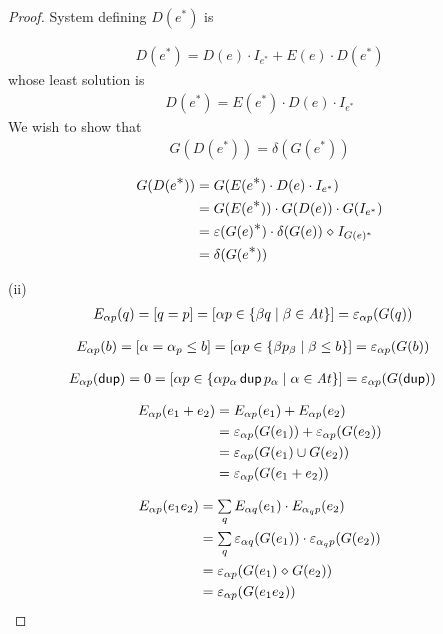 \documentclass{article}
\newcommand\At{\ensuremath{\mathit{At}}}
\renewcommand\smash{\mathrel{\diamond}}
\newcommand\ssum{\mathop{\textstyle\sum}}
\newcommand\pdup{\mathop{\mathsf{dup}}}
\newcommand\bval[1]{[#1]}
\renewcommand\star{^{\textstyle *}}
\begin{document}
\begin{proof}
System defining $D(e\star)$ is

\begin{align*}
D(e\star) = D(e)\cdot I_{e^*} + E(e)\cdot D(e\star)
\end{align*}
whose least solution is 
\begin{align*}
D(e\star) = E(e\star)\cdot D(e)\cdot I_{e^*}
\end{align*}
We wish to show that
\begin{align*}
G(D(e\star)) = \delta(G(e\star))
\end{align*}

\begin{align*}
G(D(e\star)) &= G(E(e\star)\cdot D(e)\cdot I_{e^*})\\
&= G(E(e\star))\cdot G(D(e))\cdot G(I_{e^*})\\
&= \eps(G(e)\star)\cdot\delta(G(e))\smash I_{G(e)^*}\\
&= \delta(G(e\star))
\end{align*}

(ii)
\begin{align*}
E_{\alpha p}(q)
&= \bval{q = p}
= \bval{\alpha p\in\set{\beta q}{\beta\in\At}}
= \eps_{\alpha p}(G(q))
\end{align*}

\begin{align*}
E_{\alpha p}(b)
&= \bval{\alpha=\alpha_p\leq b}
= \bval{\alpha p\in\set{\beta p_\beta}{\beta\leq b}}
= \eps_{\alpha p}(G(b))
\end{align*}

\begin{align*}
E_{\alpha p}(\pdup)
&= 0
= \bval{\alpha p\in\set{\alpha p_\alpha\pdup p_\alpha}{\alpha\in\At}}
= \eps_{\alpha p}(G(\pdup))
\end{align*}

\begin{align*}
E_{\alpha p}(e_1+e_2)
&= E_{\alpha p}(e_1)+E_{\alpha p}(e_2)\\
&= \varepsilon_{\alpha p}(G(e_1)) + \varepsilon_{\alpha p}(G(e_2))\\
&= \varepsilon_{\alpha p}(G(e_1)\cup G(e_2))\\
&= \varepsilon_{\alpha p}(G(e_1+e_2))
\end{align*}

\begin{align*}
E_{\alpha p}(e_1e_2)
&= \ssum_{q} E_{\alpha q}(e_1)\cdot E_{\alpha_q p}(e_2)\\
&= \ssum_{q} \eps_{\alpha q}(G(e_1))\cdot \eps_{\alpha_q p}(G(e_2))\\
&= \eps_{\alpha p}(G(e_1)\smash G(e_2))\\
&= \eps_{\alpha p}(G(e_1e_2))
\end{align*}


\end{proof}
\end{document}

